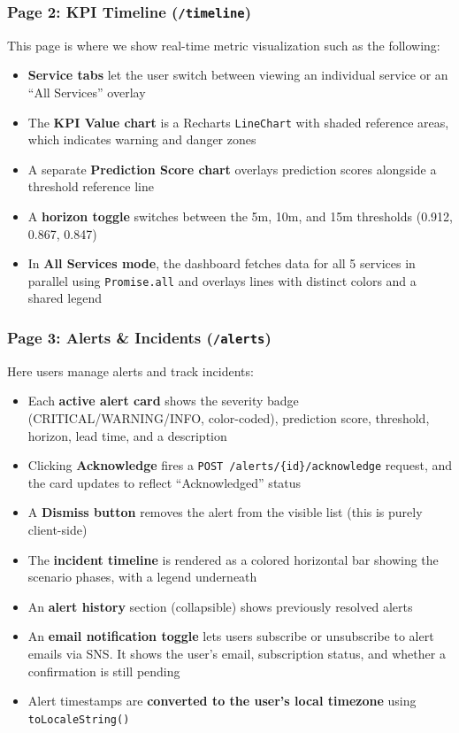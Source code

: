 \documentclass[11pt,a4paper]{article}
\begin{document}
\subsubsection{Page 2: KPI Timeline (\texttt{/timeline})}

This page is where we show real-time metric visualization such as the following:
\begin{itemize}[leftmargin=2em]
    \item \textbf{Service tabs} let the user switch between viewing an individual service or an ``All Services'' overlay
    \item The \textbf{KPI Value chart} is a Recharts \texttt{LineChart} with shaded reference areas, which indicates warning and danger zones
    \item A separate \textbf{Prediction Score chart} overlays prediction scores alongside a threshold reference line
    \item A \textbf{horizon toggle} switches between the 5m, 10m, and 15m thresholds (0.912, 0.867, 0.847)
    \item In \textbf{All Services mode}, the dashboard fetches data for all 5 services in parallel using \texttt{Promise.all} and overlays lines with distinct colors and a shared legend
\end{itemize}

\subsubsection{Page 3: Alerts \& Incidents (\texttt{/alerts})}

Here users manage alerts and track incidents:
\begin{itemize}[leftmargin=2em]
    \item Each \textbf{active alert card} shows the severity badge (CRITICAL/WARNING/INFO, color-coded), prediction score, threshold, horizon, lead time, and a description
    \item Clicking \textbf{Acknowledge} fires a \texttt{POST /alerts/\{id\}/acknowledge} request, and the card updates to reflect ``Acknowledged'' status
    \item A \textbf{Dismiss button} removes the alert from the visible list (this is purely client-side)
    \item The \textbf{incident timeline} is rendered as a colored horizontal bar showing the scenario phases, with a legend underneath
    \item An \textbf{alert history} section (collapsible) shows previously resolved alerts
    \item An \textbf{email notification toggle} lets users subscribe or unsubscribe to alert emails via SNS. It shows the user's email, subscription status, and whether a confirmation is still pending
    \item Alert timestamps are \textbf{converted to the user's local timezone} using \texttt{toLocaleString()}
\end{itemize}
\end{document}
